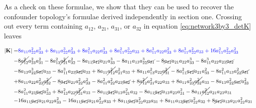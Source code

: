 \documentclass{article}
\begin{document}
\newpage
As a check on these formulae, we show that they can be used to recover the confounder topology's formulae derived independently in section one. Crossing out every term containing $a_{12}$, $a_{21}$, $a_{31}$, or $a_{32}$ in equation \ref{eq:network3by3_detK} leaves

\begin{equation}
\begin{aligned}
|\mathbf{K}| = & \textcolor{blue}{8 a_{11} a_{22}^{2} a_{33}^{3} + 8 a_{11} a_{22}^{3} a_{33}^{2} + 8 a_{11}^{2} a_{22} a_{33}^{3} + 8 a_{11}^{2} a_{22}^{3} a_{33} + 8 a_{11}^{3} a_{22} a_{33}^{2} + 8 a_{11}^{3} a_{22}^{2} a_{33} + 16 a_{11}^{2} a_{22}^{2} a_{33}^{2}} \\
-& 8 \cancel{a_{12}^{2}} a_{23}^{2} a_{31}^{2} - 8 a_{13}^{2} \cancel{a_{21}^{2}} a_{32}^{2} - 8 a_{11} \cancel{a_{12}} a_{21} a_{33}^{3} - 8 a_{11} a_{13} a_{22}^{3} \cancel{a_{31}} - 8 \cancel{a_{12}} a_{21} a_{22} a_{33}^{3} - 8 a_{11}^{3} a_{22} a_{23} \cancel{a_{32}} \\
-& 8 a_{13} a_{22}^{3} \cancel{a_{31}} a_{33} - 8 a_{11}^{3} a_{23} \cancel{a_{32}} a_{33} + 8 a_{11} \cancel{a_{12}^{2}} a_{21}^{2} a_{33} + 8 a_{11} a_{13}^{2} a_{22} \cancel{a_{31}^{2}} - 8 a_{11}^{2} \cancel{a_{12}} a_{21} a_{33}^{2} - 8 a_{11}^{2} a_{13} a_{22}^{2} \cancel{a_{31}} \\
+& 8 a_{11} a_{22} a_{23}^{2} \cancel{a_{32}^{2}} - 8 \cancel{a_{12}} a_{21} a_{22}^{2} a_{33}^{2} - 8 a_{11}^{2} a_{22}^{2} a_{23} \cancel{a_{32}} + 8 \cancel{a_{12}^{2}} a_{21}^{2} a_{22} a_{33} + 8 a_{11} a_{23}^{2} \cancel{a_{32}^{2}} a_{33} - 8 a_{13} a_{22}^{2} \cancel{a_{31}} a_{33}^{2} \\
-& 8 a_{11}^{2} a_{23} \cancel{a_{32}} a_{33}^{2} + 8 a_{13}^{2} a_{22} \cancel{a_{31}^{2}} a_{33} - 8 a_{11} \cancel{a_{12}} a_{13} a_{21}^{2} a_{32} - 8 a_{11} \cancel{a_{12}} a_{13} a_{23} a_{31}^{2} - 8 a_{11} \cancel{a_{12}^{2}} a_{21} a_{23} a_{31} \\
-& 16 a_{11} \cancel{a_{12}} a_{21} a_{22} a_{33}^{2} - 16 a_{11} \cancel{a_{12}} a_{21} a_{22}^{2} a_{33} + 8 a_{11} \cancel{a_{12}} a_{22}^{2} a_{23} a_{31} + 8 a_{11} a_{13} \cancel{a_{21}} a_{22}^{2} a_{32} + 8 \cancel{a_{12}} a_{13} a_{21} a_{22}^{2} a_{31} \\

\end{aligned}
\end{equation}
\end{document}
